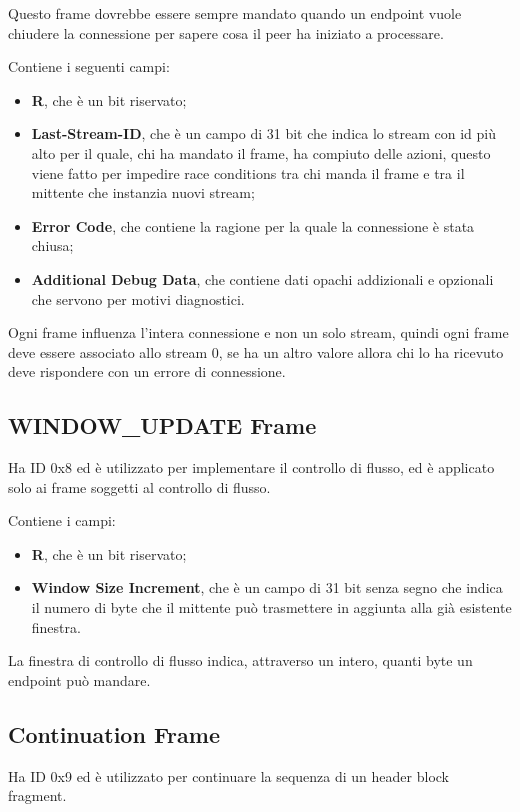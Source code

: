 \documentclass[12pt, a4paper]{article} %
\begin{document}
Questo frame dovrebbe essere sempre mandato quando un endpoint vuole chiudere la connessione per sapere cosa il peer ha iniziato a processare.

Contiene i seguenti campi:
\begin{itemize}
  \item \textbf{R}, che è un bit riservato;
  \item \textbf{Last-Stream-ID}, che è un campo di 31 bit che indica lo stream con id più alto per il quale, chi ha mandato il frame, ha compiuto delle azioni, questo viene fatto per impedire race conditions tra chi manda il frame e tra il mittente che instanzia nuovi stream;
  \item \textbf{Error Code}, che contiene la ragione per la quale la connessione è stata chiusa;
  \item \textbf{Additional Debug Data}, che contiene dati opachi addizionali e opzionali che servono per motivi diagnostici.
\end{itemize}

Ogni frame influenza l'intera connessione e non un solo stream, quindi ogni frame deve essere associato allo stream 0, se ha un altro valore allora chi lo ha ricevuto deve rispondere con un errore di connessione.

\subsection{WINDOW\_UPDATE Frame}
Ha ID 0x8 ed è utilizzato per implementare il controllo di flusso, ed è applicato solo ai frame soggetti al controllo di flusso.

Contiene i campi:
\begin{itemize}
  \item \textbf{R}, che è un bit riservato;
  \item \textbf{Window Size Increment}, che è un campo di 31 bit senza segno che indica il numero di byte che il mittente può trasmettere in aggiunta alla già esistente finestra.
\end{itemize}

La finestra di controllo di flusso indica, attraverso un intero, quanti byte un endpoint può mandare.

\subsection{Continuation Frame}
Ha ID 0x9 ed è utilizzato per continuare la sequenza di un header block fragment.
\end{document}
